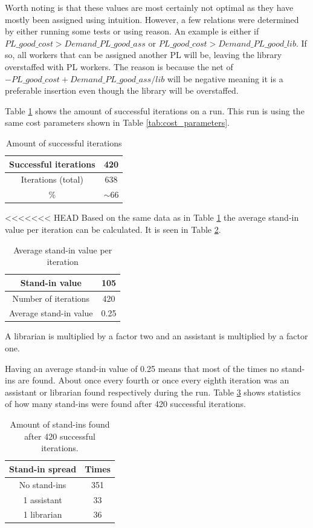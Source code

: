 Worth noting is that these values are most certainly not optimal as they have mostly been assigned using intuition. However, a few relations were determined by either running some tests or using reason. An example is either if $PL\_good\_cost > Demand\_PL\_good\_ass$ or $PL\_good\_cost > Demand\_PL\_good\_lib$. If so, all workers that can be assigned another PL will be, leaving the library overstaffed with PL workers. The reason is because the net of $-PL\_good\_cost + Demand\_PL\_good\_ass/lib$ will be negative meaning it is a preferable insertion even though the library will be overstaffed.

Table \ref{successful_iter} shows the amount of successful iterations on a run. This run is using the same cost parameters shown in Table \ref{tab:cost_parameters}. 
\begin{table}[!h]
\centering
\caption{Amount of successful iterations}
\label{successful_iter}
\begin{tabular}{|c|c|}
\hline
Successful iterations         & 420      \\ \hline
Iterations (total) & 638      \\ \hline
\%                 & $\sim$66 \\ \hline
\end{tabular}
\end{table}

<<<<<<< HEAD
Based on the same data as in Table \ref{successful_iter} the average stand-in value per iteration can be calculated. It is seen in Table \ref{tab:average_stand_ins}.
\begin{table}[!h]
\centering
\caption{Average stand-in value per iteration}
\label{tab:average_stand_ins}
\begin{tabular}{|c|c|}
\hline
Stand-in value & 105      \\ \hline
Number of iterations         & 420      \\ \hline
Average stand-in value      & 0.25 \\ \hline
\end{tabular}
\end{table}
A librarian is multiplied by a factor two and an assistant is multiplied by a factor one.

Having an average stand-in value of 0.25 means that most of the times no stand-ins are found. About once every fourth or once every eighth iteration was an assistant or librarian found respectively during the run. Table \ref{tab:stand_in_spread} shows statistics of how many stand-ins were found after 420 successful iterations. 
\begin{table}[!h]
\centering
\caption{Amount of stand-ins found after 420 successful iterations.}
\label{tab:stand_in_spread}
\begin{tabular}{|c|c|}
\hline
\rowcolor[HTML]{D2D2D2} 
Stand-in spread & Times \\ \hline
No stand-ins    & 351                      \\ \hline
1 assistant     & 33                      \\ \hline
1 librarian 	& 36 \\ \hline
\end{tabular}
\end{table}


